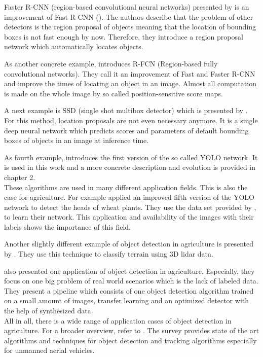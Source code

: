 Faster R-CNN (region-based convolutional neural networks) presented by \cite{faster_rcnn} is an improvement of Fast R-CNN (\cite{fast_rcnn}). The authors describe that the problem of other detectors is the region proposal of objects meaning that the location of bounding boxes is not fast enough by now. Therefore, they introduce a region proposal network which automatically locates objects. 

As another concrete example, \cite{rfcn} introduces R-FCN (Region-based fully convolutional networks). They call it an improvement of Fast and Faster R-CNN and improve the times of locating an object in an image. Almost all computation is made on the whole image by so called position-sensitive score maps.

A next example is SSD (single shot multibox detector) which is presented by \cite{ssd}. For this method, location proposals are not even necessary anymore. It is a single deep neural network which predicts scores and parameters of default bounding boxes of objects in an image at inference time. 

As fourth example, \cite{yolov1} introduces the first version of the so called YOLO network. It is used in this work and a more concrete description and evolution is provided in chapter 2. \\

These algorithms are used in many different application fields. This is also the case for agriculture. For example \cite{wheat_heads} applied an improved fifth version of the YOLO network to detect the heads of wheat plants. They use the data set provided by \cite{wheat_dataset}, to learn their network. This application and availability of the images with their labels shows the importance of this field.

Another slightly different example of object detection in agriculture is presented by \cite{terrain_example}. They use this technique to classify terrain using 3D lidar data. 

\cite{bale_detection} also presented one application of object detection in agriculture. Especially, they focus on one big problem of real world scenarios which is the lack of labeled data. They present a pipeline which consists of one object detection algorithm trained on a small amount of images, transfer learning and an optimized detector with the help of synthesized data. \\

All in all, there is a wide range of application cases of object detection in agriculture. For a broader overview, refer to \cite{applications_review}. The survey provides state of the art algorithms and techniques for object detection and tracking algorithms especially for unmanned aerial vehicles. 